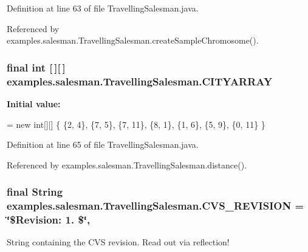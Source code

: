 Definition at line 63 of file Travelling\-Salesman.\-java.



Referenced by examples.\-salesman.\-Travelling\-Salesman.\-create\-Sample\-Chromosome().

\hypertarget{classexamples_1_1salesman_1_1_travelling_salesman_acd4f8e271c8cd63d71a6ffb953370232}{
\subsubsection[{C\-I\-T\-Y\-A\-R\-R\-A\-Y}]{\setlength{\rightskip}{0pt plus 5cm}final int \mbox{[}$\,$\mbox{]}\mbox{[}$\,$\mbox{]} examples.\-salesman.\-Travelling\-Salesman.\-C\-I\-T\-Y\-A\-R\-R\-A\-Y\hspace{0.3cm}{\ttfamily [static]}}}\label{classexamples_1_1salesman_1_1_travelling_salesman_acd4f8e271c8cd63d71a6ffb953370232}
{\bfseries Initial value\-:}
\begin{DoxyCode}
= \textcolor{keyword}{new} \textcolor{keywordtype}{int}[][] \{ \{2, 4\}, \{7, 5\}, \{7, 11\},
      \{8, 1\}, \{1, 6\}, \{5, 9\}, \{0, 11\}
  \}
\end{DoxyCode}


Definition at line 65 of file Travelling\-Salesman.\-java.



Referenced by examples.\-salesman.\-Travelling\-Salesman.\-distance().

\hypertarget{classexamples_1_1salesman_1_1_travelling_salesman_a82d86ae3a72943681e09da420164b6de}{
\subsubsection[{C\-V\-S\-\_\-\-R\-E\-V\-I\-S\-I\-O\-N}]{\setlength{\rightskip}{0pt plus 5cm}final String examples.\-salesman.\-Travelling\-Salesman.\-C\-V\-S\-\_\-\-R\-E\-V\-I\-S\-I\-O\-N = \char`\"{}\$Revision\-: 1. \$\char`\"{}\hspace{0.3cm}{\ttfamily [static]}, {\ttfamily [private]}}}\label{classexamples_1_1salesman_1_1_travelling_salesman_a82d86ae3a72943681e09da420164b6de}
String containing the C\-V\-S revision. Read out via reflection! 

